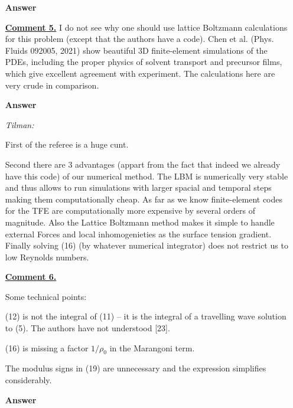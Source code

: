 \documentclass[12pt,english]{article}
\begin{document}
\begin{itemize}
\item[ \textbf{{Answer}}]
{

}

\item[ \textbf{\underline{Comment 5.}}]
{
I do not see why one should use lattice Boltzmann calculations for this problem (except that the authors have a code). 
Chen et al. (Phys. Fluids 092005, 2021) show beautiful 3D finite-element simulations of the PDEs, including the proper physics of solvent transport and
precursor films, which give excellent agreement with experiment. 
The calculations here are very crude in comparison.
}

\item[ \textbf{{Answer}}]
{
\emph{Tilman: }

First of the referee is a huge cunt.


Second there are 3 advantages (appart from the fact that indeed we already have this code) of our numerical method. The LBM is numerically very stable and thus allows to run simulations with larger spacial and temporal steps making them computationally cheap. As far as we know finite-element codes for the TFE are computationally more expensive by several orders of magnitude. Also the Lattice Boltzmann method makes it simple to handle external Forces and local inhomogenieties as the surface tension gradient. Finally solving (16) (by whatever numerical integrator) does not restrict us to low Reynolds numbers.  

}

\item[ \textbf{\underline{Comment 6.}}]
{
Some technical points:

(12) is not the integral of (11) -- it is the integral of a travelling
wave solution to (5). The authors have not understood [23].

(16) is missing a factor $1/\rho_0$ in the Marangoni term.

The modulus signs in (19) are unnecessary and the expression
simplifies considerably.
}

\item[ \textbf{{Answer}}]
{

}
\end{itemize}




\end{document}
